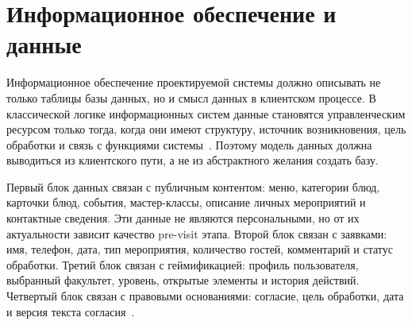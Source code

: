 \section{Информационное обеспечение и данные}

Информационное обеспечение проектируемой системы должно описывать не только таблицы базы данных, но и смысл данных в клиентском процессе. В классической логике информационных систем данные становятся управленческим ресурсом только тогда, когда они имеют структуру, источник возникновения, цель обработки и связь с функциями системы~\cite{utkin_baldin_2003,gost34003}. Поэтому модель данных должна выводиться из клиентского пути, а не из абстрактного желания создать базу.

Первый блок данных связан с публичным контентом: меню, категории блюд, карточки блюд, события, мастер-классы, описание личных мероприятий и контактные сведения. Эти данные не являются персональными, но от их актуальности зависит качество pre-visit этапа. Второй блок связан с заявками: имя, телефон, дата, тип мероприятия, количество гостей, комментарий и статус обработки. Третий блок связан с геймификацией: профиль пользователя, выбранный факультет, уровень, открытые элементы и история действий. Четвертый блок связан с правовыми основаниями: согласие, цель обработки, дата и версия текста согласия~\cite{fz152,moric2024}.

